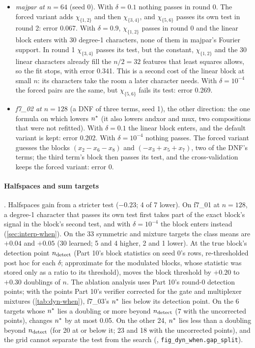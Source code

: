 \begin{itemize}
\item \emph{majpar at $n=64$} (seed 0). With $\delta=0.1$ nothing passes in round 0. The forced variant adds $\chi_{\{1,2\}}$ and then $\chi_{\{3,4\}}$, and $\chi_{\{5,6\}}$ passes its own test in round 2: error 0.067. With $\delta=0.9$, $\chi_{\{1,2\}}$ passes in round 0 and the linear block enters with 30 degree-1 characters, none of them in majpar's Fourier support. In round 1 $\chi_{\{3,4\}}$ passes its test, but the constant, $\chi_{\{1,2\}}$ and the 30 linear characters already fill the $n/2=32$ features that least squares allows, so the fit stops, with error 0.341. This is a second cost of the linear block at small $n$: its characters take the room a later character needs. With $\delta=10^{-4}$ the forced pairs are the same, but $\chi_{\{5,6\}}$ fails its test: error 0.269.
\item \emph{f7\_02 at $n=128$} (a DNF of three terms, seed 1), the other direction: the one formula on which  lowers $n^{*}$ (it also lowers andxor and mux, two compositions that were not refitted). With $\delta=0.1$ the linear block enters, and the default variant is kept: error 0.202. With $\delta=10^{-4}$ nothing passes. The forced variant guesses the blocks $(x_2-x_6-x_8)$ and $(-x_3+x_5+x_7)$, two of the DNF's terms; the third term's block then passes its test, and the cross-validation keeps the forced variant: error 0.
\end{itemize}

\paragraph{Halfspaces and sum targets} . Halfspaces gain from a stricter test ($-0.23$; 4 of 7 lower). On f7\_01 at $n=128$, a degree-1 character that passes its own test first takes part of the exact block's signal in the block's second test, and with $\delta=10^{-4}$ the block enters instead (\cref{sec:interp-when}). On the 33 symmetric and mixture targets the class means are $+0.04$ and $+0.05$ (30 learned; 5 and 4 higher, 2 and 1 lower). At the true block's detection point $n_{\rm detect}$ (Part 10's block statistics on seed 0's rows, re-thresholded post hoc for each $\delta$; approximate for the modulated blocks, whose statistic was stored only as a ratio to its threshold),  moves the block threshold by $+0.20$ to $+0.30$ doublings of $n$. The ablation analysis uses Part 10's round-0 detection points; with the points Part 10's verifier corrected for the gate and multiplexer mixtures (\cref{tab:dyn-when}), f7\_03's $n^{*}$ lies below its detection point. On the 6 targets whose $n^{*}$ lies a doubling or more beyond $n_{\rm detect}$ (7 with the uncorrected points),  changes $n^{*}$ by at most 0.05. On the other 24, $n^{*}$ lies less than a doubling beyond $n_{\rm detect}$ (for 20 at or below it; 23 and 18 with the uncorrected points), and the grid cannot separate the test from the search (, \texttt{fig\_dyn\_when.gap\_split}).

